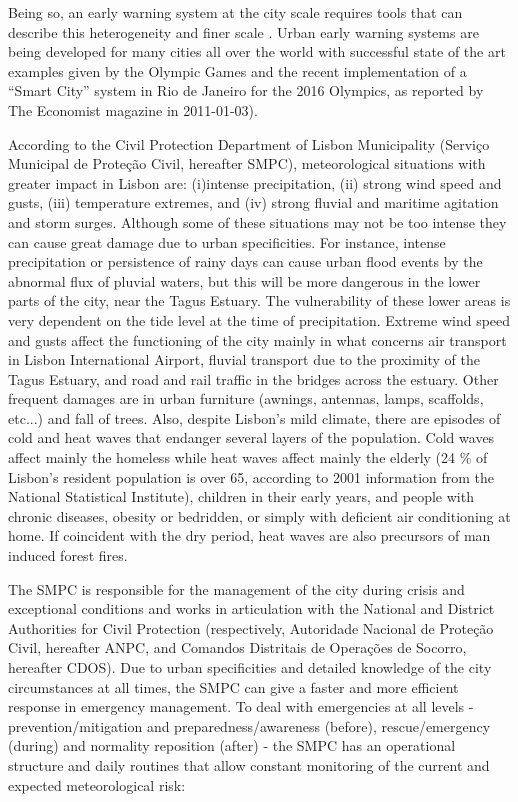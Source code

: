 Being so, an early warning system at the city scale requires tools that can describe this heterogeneity and finer scale \citep{Pullen2008, Trusilova2008}. Urban early warning systems are being developed for many cities all over the world \citep{Koskinen2011, Sharif2006, WMO2010} with successful state of the art examples given by the Olympic Games \citep{Mailhot2010, Wilson2010} and the recent implementation of a ``Smart City'' system in Rio de Janeiro for the 2016 Olympics, as reported by The Economist magazine in 2011-01-03).

According to the Civil Protection Department of Lisbon Municipality (Serviço Municipal de Proteção Civil, hereafter SMPC), meteorological situations with greater impact in Lisbon are: (i)intense precipitation, (ii) strong wind speed and gusts, (iii) temperature extremes, and 
(iv) strong fluvial and maritime agitation and storm surges. Although some of these situations may not be too intense they can cause great damage due to urban specificities. For instance, intense precipitation or persistence of rainy days can cause urban flood events by the abnormal flux of pluvial waters, but this will be more dangerous in the lower parts of the city, near the Tagus Estuary. The vulnerability of these lower areas is very dependent on the tide level at the time of precipitation. Extreme wind speed and gusts affect the functioning of the city mainly in what concerns air transport in Lisbon International Airport, fluvial transport due to the proximity of the Tagus Estuary, and road and rail traffic in the bridges across the estuary. Other frequent damages are in urban furniture (awnings, antennas, lamps, scaffolds, etc...) and fall of trees. Also, despite Lisbon's mild climate, there are episodes of cold and heat waves that endanger several layers of the population. Cold waves affect mainly the homeless while heat waves affect mainly the elderly (24 \% of Lisbon's resident population is over 65, according to 2001 information from the National Statistical Institute), children in their early years, and people with chronic diseases, obesity or bedridden, or simply with deficient air conditioning at home. If coincident with the dry period, heat waves are also precursors of man induced forest fires. 

The SMPC is responsible for the management of the city during crisis and exceptional conditions and works in articulation with the National and District Authorities for Civil Protection (respectively, Autoridade Nacional de Proteção Civil, hereafter ANPC, and Comandos Distritais de Operações de Socorro, hereafter CDOS). Due to urban specificities and detailed knowledge of the city circumstances at all times, the SMPC can give a faster and more efficient response in emergency management. To deal with emergencies at all levels - prevention/mitigation and preparedness/awareness (before), rescue/emergency (during) and normality reposition (after) - the SMPC has an operational structure and daily routines that allow constant monitoring of the current and expected meteorological risk:

